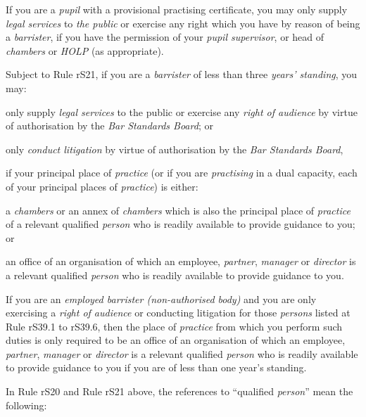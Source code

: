 
If you are a \emph{pupil} with a provisional practising certificate, you
may only supply \emph{legal services} to \emph{the public} or exercise
any right which you have by reason of being a \emph{barrister}, if you
have the permission of your \emph{pupil supervisor}, or head of
\emph{chambers} or \emph{HOLP} (as appropriate).


Subject to Rule rS21, if you are a \emph{barrister} of less than three
\emph{years' standing}, you may:
\nl\item only supply \emph{legal services} to the public or exercise any
\emph{right of audience} by virtue of authorisation by the \emph{Bar
Standards Board}; or
\item only \emph{conduct litigation} by virtue of authorisation by the
\emph{Bar Standards Board},

if your principal place of \emph{practice} (or if you are
\emph{practising} in a dual capacity, each of your principal places of
\emph{practice}) is either:

\al\item a \emph{chambers} or an annex of \emph{chambers} which is also the
principal place of \emph{practice} of a relevant qualified \emph{person}
who is readily available to provide guidance to you; or

\item an office of an organisation of which an employee, \emph{partner},
\emph{manager} or \emph{director} is a relevant qualified \emph{person}
who is readily available to provide guidance to you.
\la\ln
{}

If you are an \emph{employed barrister (non-authorised body)} and you
are only exercising a \emph{right of audience} or conducting litigation
for those \emph{persons} listed at Rule rS39.1 to rS39.6, then the place
of \emph{practice} from which you perform such duties is only required
to be an office of an organisation of which an employee, \emph{partner},
\emph{manager} or \emph{director} is a relevant qualified \emph{person}
who is readily available to provide guidance to you if you are of less
than one year's standing.


In Rule rS20 and Rule rS21 above, the references to ``qualified
\emph{person}'' mean the following:

